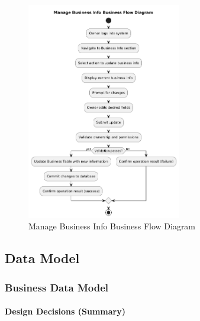 \documentclass[]{VUMIFTemplateClass}
\begin{document}
\begin{figure}[H]
    \centering
    \includegraphics[width=0.6\textwidth]{images/diagrams/business/bpmn_business_info_manage.png}
    \caption{Manage Business Info Business Flow Diagram}
    \label{fig:business_info_manage_flow}
\end{figure}

\subsection{Data Model}

\subsubsection{Business Data Model}

\paragraph{Design Decisions (Summary)}
\end{document}
